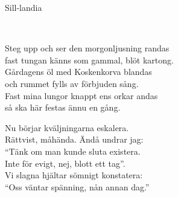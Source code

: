\begin{song}{Sill-landia}

    
    \\
    

    Steg upp och ser den morgonljusning randas\\
	fast tungan känns som gammal, blöt kartong.\\
	Gårdagens öl med Koskenkorva blandas\\
	och rummet fylls av förbjuden sång.\\
	Fast mina lungor knappt ens orkar andas\\
	så ska här festas ännu en gång.

	Nu börjar kväljningarna eskalera.\\
	Rättvist, måhända. Ändå undrar jag:\\
	``Tänk om man kunde sluta existera.\\
	Inte för evigt, nej, blott ett tag''.\\
	Vi slagna hjältar sömnigt konstatera:\\
	``Oss väntar spänning, nån annan dag.''



\end{song}
